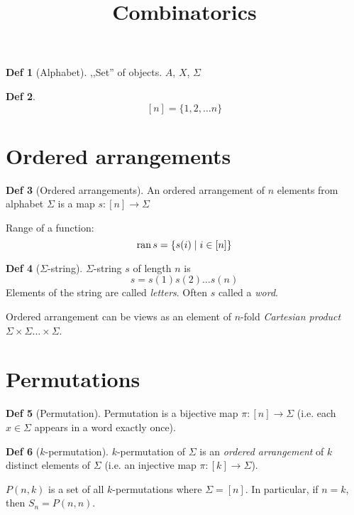 \documentclass[a4paper]{article}
\title{Combinatorics}
\author{}
\theoremstyle{definition}
\newtheorem{definition}{Def}
\begin{document}
\maketitle

\begin{definition}[Alphabet]
  ,,Set'' of objects. \(A\), \(X\), \(\Sigma\)
\end{definition}

\begin{definition}
  \[[n] = \{1, 2, \ldots n\}\]
\end{definition}

\section{Ordered arrangements}

\begin{definition}[Ordered arrangements]
  An ordered arrangement of \(n\) elements from alphabet \(\Sigma\) is a map
  \(s : [n] \to \Sigma\)
\end{definition}

Range of a function:
\[\operatorname{ran} s = \{ s(i) \mid i \in [n] \}\]

\begin{definition}[\(\Sigma\)-string]
 \(\Sigma\)-string \(s\) of length \(n\) is
 \[ s = s(1) s(2) \ldots s(n) \]
 Elements of the string are called \textit{letters}.
 Often \(s\) called a \textit{word}.
\end{definition}

Ordered arrangement can be views as an element of
\(n\)-fold \textit{Cartesian product}
\(\Sigma \times \Sigma \ldots \times \Sigma\).

\section{Permutations}
\begin{definition}[Permutation]
  Permutation is a bijective map \(\pi : [n] \to \Sigma\)
  (i.e. each \(x \in \Sigma\) appears in a word exactly once).
\end{definition}

\begin{definition}[\(k\)-permutation]
  \(k\)-permutation of \(\Sigma\) is an
  \textit{ordered arrangement} of \(k\) distinct elements of \(\Sigma\)
  (i.e. an injective map \(\pi : [k] \to \Sigma\)).
\end{definition}

\(P(n, k)\) is a set of all \(k\)-permutations where \(\Sigma = [n]\).
In particular, if \(n = k\), then \(S_n = P(n, n)\).
\end{document}
